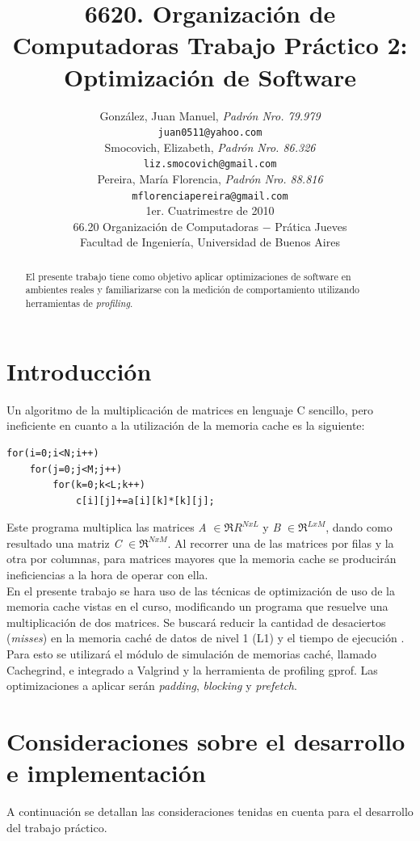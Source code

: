 \documentclass[a4paper,10pt]{article}
\title{ \textbf{ 6620. Organizaci\'on de Computadoras
Trabajo Pr\'actico 2: Optimizaci\'on de Software}}
\author{	Gonz\'alez, Juan Manuel, \textit{Padr\'on Nro. 79.979} \\
            	\texttt{ juan0511@yahoo.com } \\[2.5ex]
		Smocovich, Elizabeth, \textit{Padr\'on Nro. 86.326} \\
            	\texttt{ liz.smocovich@gmail.com } \\[2.5ex]
            	Pereira, Mar\'ia Florencia, \textit{Padr\'on Nro. 88.816} \\
            	\texttt{ mflorenciapereira@gmail.com } \\[2.5ex]
            	\normalsize{1er. Cuatrimestre de 2010} \\
            	\normalsize{66.20 Organizaci\'on de Computadoras  $-$ Pr\'atica Jueves} \\
            	\normalsize{Facultad de Ingenier\'ia, Universidad de Buenos Aires} \\
       }
\date{}
\begin{document}
\maketitle
\thispagestyle{empty}  %

\begin{abstract}
El presente trabajo tiene como objetivo aplicar optimizaciones de software en ambientes reales y familiarizarse con la medici\'on de comportamiento utilizando herramientas de \textit{profiling}.
\end{abstract}

\pagebreak

\pagestyle{empty}
\section{Introducci\'on}
Un algoritmo de la multiplicaci\'on de matrices en lenguaje C sencillo, pero ineficiente en cuanto a la utilizaci\'on de la memoria cache es la siguiente:

\begin{verbatim}
for(i=0;i<N;i++)
    for(j=0;j<M;j++)
        for(k=0;k<L;k++)
            c[i][j]+=a[i][k]*[k][j];
\end{verbatim}

Este programa multiplica las matrices \textit{A} $\in \Re{R}^{NxL}$ y \textit{B} $\in \Re^{LxM}$, dando como resultado una matriz \textit{C} $\in \Re^{NxM}$. Al recorrer una de las matrices por filas y la otra por columnas, para matrices mayores que la memoria cache se producir\'an ineficiencias a la hora de operar con ella.\\
En el presente trabajo se hara uso de las t\'ecnicas de optimizaci\'on de uso de la memoria cache vistas en el curso, modificando un programa que resuelve una multiplicaci\'on de dos matrices. Se buscar\'a reducir la cantidad de desaciertos (\textit{misses}) en la memoria cach\'e de datos de nivel 1 (L1) y el tiempo de ejecuci\'on . Para esto se utilizar\'a el m\'odulo de simulaci\'on de memorias cach\'e, llamado Cachegrind, e integrado a Valgrind y la herramienta de profiling gprof. Las optimizaciones a aplicar ser\'an \textit{padding},  \textit{blocking} y \textit{prefetch}.

\section{Consideraciones sobre el desarrollo e implementaci\'on}
A continuaci\'on se detallan las consideraciones tenidas en cuenta para el desarrollo del trabajo pr\'actico. 
\end{document}
